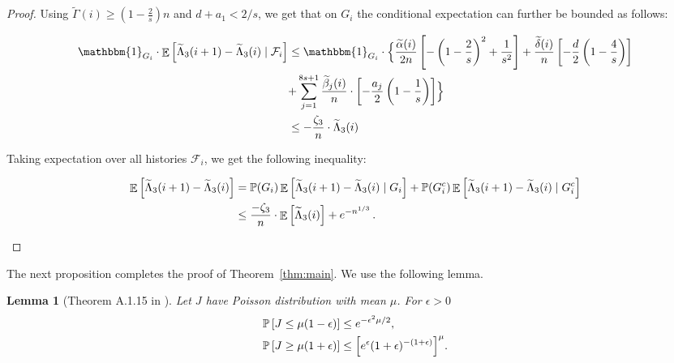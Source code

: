 \documentclass[a4paper,12pt]{article}
\newtheorem{lemma}{Lemma}
\DeclareMathOperator{\Ex}{\mathbb{E}}%
\begin{document}
\begin{proof}
Using $\widetilde{\Gamma}(i) \geq (1 - \frac{2}{s})n$ and $d + a_1 < 2/s$, we get that on $G_i$ the conditional expectation can further be bounded as follows:
\begin{small}
\begin{align}
\mathbbm{1}_{G_i} \cdot \Ex\left[ \widetilde{\Lambda}_{3}(i+1) - \widetilde{\Lambda}_{3}(i) \mid \mathcal{F}_i \right] & \leq \mathbbm{1}_{G_i} \cdot
\Bigl\{ \frac{\widetilde{\alpha}(i)}{2n} \left[ - \left(1 - \frac{2}{s}\right)^2 + \frac{1}{s^2}\right] +  \frac{\widetilde{\delta}(i)}{n} \left[ - \frac{d}{2}\left(1 - \frac{4}{s}\right) \right] \Bigr. \notag \\
& \Bigl. + \sum_{j=1}^{8s+1} \frac{\widetilde{\beta}_j(i)}{n} \cdot \left[ - \frac{a_j}{2} \left( 1 - \frac{1}{s} \right) \right] \Bigr\} \notag \\
& \leq - \frac{\zeta_3}{n} \cdot \widetilde{\Lambda}_3(i) \notag
\end{align}
\end{small}
Taking expectation over all histories $\mathcal{F}_i$, we get the following inequality:
\begin{small}
\begin{align}
\Ex\left[ \widetilde{\Lambda}_{3}(i+1) - \widetilde{\Lambda}_{3}(i) \right] & = \mathbb{P}(G_i) \Ex\left[\widetilde{\Lambda}_{3}(i+1) - \widetilde{\Lambda}_{3}(i) \mid G_i \right] + \mathbb{P}(G_i^c) \Ex\left[\widetilde{\Lambda}_{3}(i+1) - \widetilde{\Lambda}_{3}(i) \mid G_i^c  \right] \notag \\
& \leq \frac{-\zeta_3}{n} \cdot \Ex\left[\widetilde{\Lambda}_3(i) \right] + e^{-n^{1/3}}\,. \notag
\end{align}
\end{small}
\end{proof}

The next proposition completes the proof of Theorem~\ref{thm:main}. We use the following lemma.

\begin{lemma}[Theorem A.1.15 in \cite{AlonSpencer_book}] \label{lem:alonspencer}
	Let $J$ have Poisson distribution with mean $\mu$. For $\epsilon > 0$
	\begin{align}
	\mathbb{P}\left[J \leq \mu(1-\epsilon)\right] & \leq e^{-\epsilon^2 \mu/2}, \notag \\
	\mathbb{P}\left[J \geq \mu(1+\epsilon)\right] & \leq \Bigl[ e^{\epsilon} (1 + \epsilon)^{-(1+\epsilon)}\Bigr]^{\mu}. \notag
	\end{align}
\end{lemma}
\end{document}
